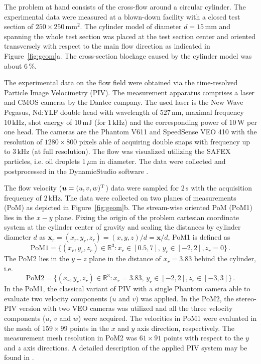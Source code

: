 The problem at hand consists of the cross-flow around a circular cylinder. The experimental data were measured at a blown-down facility with a closed test section of $250\times 250\,\mathrm{mm}^{2}$. The cylinder model of diameter $d = 15 \,\mathrm{mm}$ and spanning the whole test section was placed at the test section center and oriented transversely with respect to the main flow direction as indicated in Figure~\ref{fig:geom}a. The cross-section blockage caused by the cylinder model was about $6\,\%$.{}

The experimental data on the flow field were obtained via the time-resolved Particle Image Velocimetry (PIV). The measurement apparatus comprises a laser and CMOS cameras by the Dantec company. The used laser is the New Wave Pegasus, Nd:YLF double head with wavelength of $527\, \mathrm{nm}$, maximal frequency $10\, \mathrm{kHz}$, shot energy of $10\, \mathrm{mJ}$ (for $1\, \mathrm{kHz}$) and the corresponding power of $10\, \mathrm{W}$ per one head. The cameras are the Phantom V611 and SpeedSense VEO 410 with the resolution of $1 280 \times 800$ pixels able of acquiring double snaps with frequency up to $3\, \mathrm{kHz}$ (at full resolution). The flow was visualized utilizing the SAFEX particles, i.e. oil droplets $1\,\mu \mathrm{m}$ in diameter. The data were collected and postprocessed in the DynamicStudio software \cite{dynamicsStudio}.

The flow velocity ($\bm{u} = (u,v,w)^{\mathrm{T}}$) data were sampled for $2\,\mathrm{s}$ with the acquisition frequency of $2\,\mathrm{kHz}$. The data were collected on two planes of measurements (PoM) as depicted in Figure~\ref{fig:geom}b. The stream-wise oriented PoM (PoM1) lies in the $x-y$ plane. Fixing the origin of the problem cartesian coordinate system at the cylinder center of gravity {and scaling the distances by cylinder diameter $d$ as $\bm{x}_{r} = (x_r,y_{r},z_{r}) = (x,y,z)/d = \bm{x}/d$}, PoM1 is defined as 
\begin{equation}
    \label{eq:POM1}
    {\mathrm{PoM1} = \{(x_r,y_r,z_r)\in\mathbb{R}^{3}:x_r\in [0.5,7],\,y_r\in[-2,2],z_r=0\}}\,.
\end{equation}
The PoM2 lies in the $y-z$ plane in the distance of {$x_r = 3.83$} behind the cylinder, i.e. 
\begin{equation}
    \label{eq:POM1}
    {\mathrm{PoM2} = \{(x_r,y_r,z_r)\in\mathbb{R}^{3}:x_r = 3.83,\,y_r\in[-2,2],z_r\in[-3,3]\}}\,.
\end{equation}
In the PoM1, the classical variant of PIV with a single Phantom camera able to evaluate two velocity components ($u$ and $v$) was applied. In the PoM2, the stereo-PIV version with two VEO cameras was utilized and all the three velocity components ($u$, $v$ and $w$) were acquired. The velocities in PoM1 were evaluated in the mesh of {{$159\times 99$}} points in the $x$ and $y$ axis direction, respectively. The measurement mesh resolution in PoM2 was {{$61\times 91$}} points with respect to the $y$ and $z$ axis directions. A detailed description of the applied PIV system may be found in \cite{prochazka2019}.


